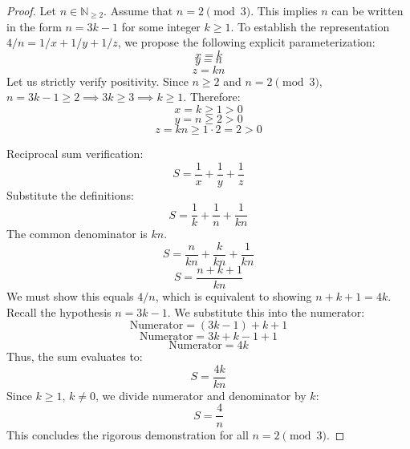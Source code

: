 \documentclass[12pt,a4paper]{article}
\begin{document}
\begin{proof}
Let $n \in \mathbb{N}_{\geq 2}$. Assume that $n = 2 \pmod 3$.
This implies $n$ can be written in the form $n = 3k - 1$ for some integer $k \ge 1$.
To establish the representation $4/n = 1/x + 1/y + 1/z$, we propose the following explicit parameterization:
\begin{equation}
x = k
\end{equation}
\begin{equation}
y = n
\end{equation}
\begin{equation}
z = kn
\end{equation}
Let us strictly verify positivity.
Since $n \geq 2$ and $n = 2 \pmod 3$, $n = 3k - 1 \ge 2 \implies 3k \ge 3 \implies k \ge 1$.
Therefore:
\begin{equation}
x = k \geq 1 > 0
\end{equation}
\begin{equation}
y = n \geq 2 > 0
\end{equation}
\begin{equation}
z = kn \geq 1 \cdot 2 = 2 > 0
\end{equation}

Reciprocal sum verification:
\begin{equation}
S = \frac{1}{x} + \frac{1}{y} + \frac{1}{z}
\end{equation}
Substitute the definitions:
\begin{equation}
S = \frac{1}{k} + \frac{1}{n} + \frac{1}{kn}
\end{equation}
The common denominator is $kn$.
\begin{equation}
S = \frac{n}{kn} + \frac{k}{kn} + \frac{1}{kn}
\end{equation}
\begin{equation}
S = \frac{n + k + 1}{kn}
\end{equation}
We must show this equals $4/n$, which is equivalent to showing $n + k + 1 = 4k$.
Recall the hypothesis $n = 3k - 1$. We substitute this into the numerator:
\begin{equation}
\text{Numerator} = (3k - 1) + k + 1
\end{equation}
\begin{equation}
\text{Numerator} = 3k + k - 1 + 1
\end{equation}
\begin{equation}
\text{Numerator} = 4k
\end{equation}
Thus, the sum evaluates to:
\begin{equation}
S = \frac{4k}{kn}
\end{equation}
Since $k \geq 1$, $k \neq 0$, we divide numerator and denominator by $k$:
\begin{equation}
S = \frac{4}{n}
\end{equation}
This concludes the rigorous demonstration for all $n = 2 \pmod 3$.
\end{proof}
\end{document}
